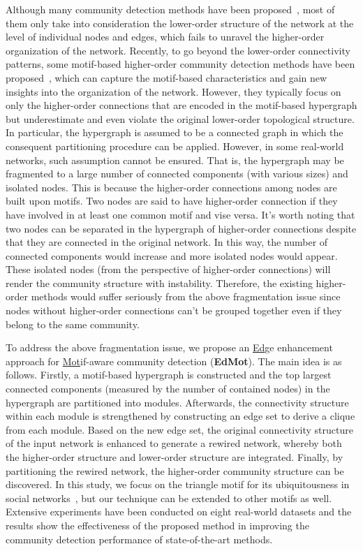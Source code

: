 \documentclass[sigconf]{acmart}
\begin{document}
Although many community detection methods have been proposed~\cite{shao2015community,he2016joint,Vincent2008Fast}, most of them only take into consideration the lower-order structure of the network at the level of individual nodes and edges, which fails to unravel the higher-order organization of the network.
Recently, to go beyond the lower-order connectivity patterns, some motif-based higher-order community detection methods have been proposed~\cite{tsourakakis2017scalable,benson2016higher,Li_HigherorderBrain:18,DBLP:conf/icdm/HuangWC18,li2018community,Huang_AAAI2019}, which can capture the motif-based characteristics and gain new insights into the organization of the network. However,
they typically focus on only the higher-order connections that are encoded in the motif-based hypergraph but underestimate and even violate the original lower-order topological structure. In particular, the hypergraph is assumed to be a connected graph in which the consequent partitioning procedure can be applied. However, in some real-world networks, such assumption cannot be ensured. That is, the hypergraph may be fragmented to a large number of connected components (with various sizes) and isolated nodes.
This is because the higher-order connections among nodes are built upon motifs. Two nodes are said to have higher-order connection if they have involved in at least one common motif and vise versa. It's worth noting that two nodes can be separated in the hypergraph of higher-order connections despite that they are connected in the original network. In this way, the number of connected components would increase and more isolated nodes would appear. These isolated nodes (from the perspective of higher-order connections) will render the community structure with instability. Therefore, the existing higher-order methods would suffer seriously from the above fragmentation issue since nodes without higher-order connections can't be grouped together even if they belong to the same community.

To address the above fragmentation issue, we propose an \underline{Ed}ge enhancement approach for \underline{Mot}if-aware community detection (\textbf{EdMot}). The main idea is as follows. Firstly, a motif-based hypergraph is constructed and the top  largest connected components (measured by the number of contained nodes) in the hypergraph are partitioned into modules. Afterwards, the connectivity structure within each module is strengthened by constructing an edge set to derive a clique from each module. Based on the new edge set, the original connectivity structure of the input network is enhanced to generate a rewired network, whereby both the higher-order structure and lower-order structure are integrated. Finally, by partitioning the rewired network, the higher-order community structure can be discovered. In this study, we focus on the triangle motif for its ubiquitousness in social networks~\cite{holland1977method,newman2003social,prat2016put}, but our technique can be extended to other motifs as well.
Extensive experiments have been conducted on eight real-world datasets and the results show the effectiveness of the proposed method in improving the community detection performance of state-of-the-art methods.
\end{document}
